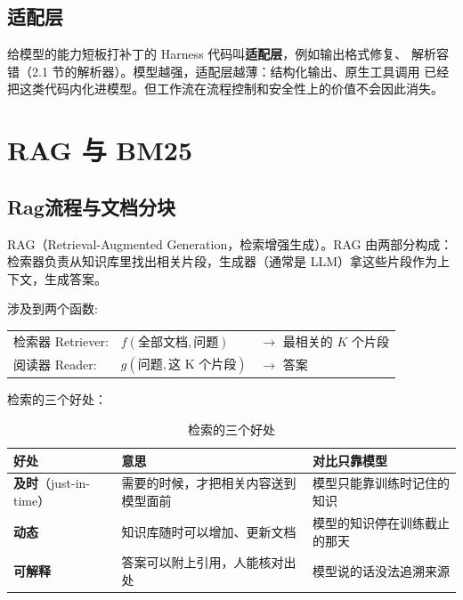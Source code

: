 \subsection{适配层}

\begin{note}
给模型的能力短板打补丁的 Harness 代码叫\textbf{适配层}，例如输出格式修复、
解析容错（2.1 节的解析器）。模型越强，适配层越薄：结构化输出、原生工具调用
已经把这类代码内化进模型。但工作流在流程控制和安全性上的价值不会因此消失。
\end{note}
\section{RAG 与 BM25}
\subsection{Rag流程与文档分块}
\begin{definition}
    RAG（Retrieval-Augmented Generation，检索增强生成）。RAG 由两部分构成：检索器负责从知识库里找出相关片段，生成器（通常是 LLM）拿这些片段作为上下文，生成答案。
\end{definition}
涉及到两个函数:\\
\begin{tcolorbox}[enhanced, sharp corners, boxrule=0pt, frame hidden,
                  borderline west={3pt}{0pt}{structurecolor},
                  colback=structurecolor!5]
    \begin{tabular}{@{}l@{\quad}l@{\quad}l@{}}
      检索器 Retriever: & $f(\text{全部文档},\text{问题} )$ & $\to$ 最相关的 $K$ 个片段 \\
      阅读器 Reader:    & $g(\text{问题}, \text{这 K 个片段})$ & $\to$ 答案
    \end{tabular}
\end{tcolorbox}
检索的三个好处：\\
\begin{table}[htbp]
\centering
\caption{检索的三个好处}
\label{tab:retrieval-benefits}
\begin{tabular}{p{3cm} p{6cm} p{6cm}}
  \toprule
  好处 & 意思 & 对比只靠模型 \\
  \midrule
  \textbf{及时}（just-in-time） & 需要的时候，才把相关内容送到模型面前 & 模型只能靠训练时记住的知识 \\
  \textbf{动态} & 知识库随时可以增加、更新文档 & 模型的知识停在训练截止的那天 \\
  \textbf{可解释} & 答案可以附上引用，人能核对出处 & 模型说的话没法追溯来源 \\
  \bottomrule
\end{tabular}
\end{table}

